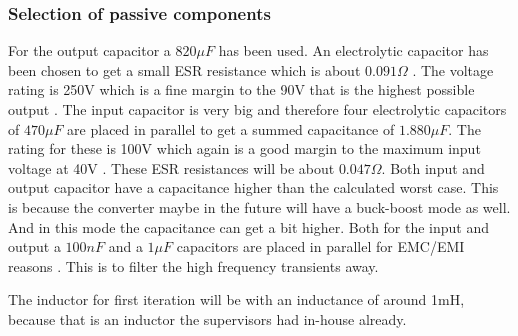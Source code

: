 \subsubsection{Selection of passive components}
For the output capacitor a $820\mu F$ has been used.   An electrolytic capacitor has been chosen to get a small ESR resistance which is about $0.091\Omega$ . The voltage rating is 250V which is a fine margin to the 90V that is the highest possible output .
The input capacitor is very big  and therefore four electrolytic capacitors of $470\mu F$  are placed in parallel to get a summed capacitance of $1.880\mu F$. The rating for these is 100V which again is a good margin to the maximum input voltage at 40V . These ESR resistances will be about $0.047\Omega$. Both input and output capacitor have a capacitance higher than the calculated worst case. This is because the converter maybe in the future will have a buck-boost mode as well. And in this mode the capacitance can get a bit higher. 
Both for the input and output a $100nF$ and a $1\mu F$ capacitors are placed in parallel for EMC/EMI reasons . This is to filter the high frequency transients away. 

The inductor for first iteration  will be with an inductance of around 1mH,  because that is an inductor the supervisors had in-house already.